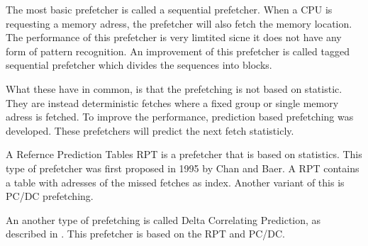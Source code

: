 The most basic prefetcher is called a sequential prefetcher. When a CPU is requesting a memory adress, the prefetcher will also fetch the memory location. The performance of this prefetcher is very limtited sicne it does not have any form of pattern recognition. An improvement of this prefetcher is called tagged sequential prefetcher which divides the sequences into blocks.

What these have in common, is that the prefetching is not based on statistic. They are instead deterministic fetches where a fixed group or single memory adress is fetched. To improve the performance, prediction based prefetching was developed. These prefetchers will predict the next fetch statisticly.   

A Refernce Prediction Tables RPT is a prefetcher that is based on statistics. This type of prefetcher was first proposed in 1995 by Chan and Baer. A RPT contains a table with adresses of the missed fetches as index. Another variant of this is PC/DC prefetching. 

An another type of prefetching is called Delta Correlating Prediction, as described in \cite{reference:jahre}. This prefetcher is based on the RPT and PC/DC.
